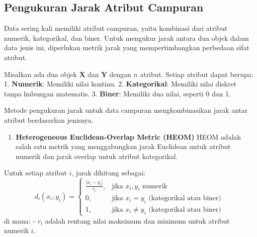 \documentclass[
  oneside]{book}
\newenvironment{Shaded}{\begin{snugshade}}{\end{snugshade}}
\newcommand{\CommentTok}[1]{\textcolor[rgb]{0.56,0.35,0.01}{\textit{#1}}}
\newcommand{\FunctionTok}[1]{\textcolor[rgb]{0.13,0.29,0.53}{\textbf{#1}}}
\newcommand{\NormalTok}[1]{#1}
\newcommand{\OtherTok}[1]{\textcolor[rgb]{0.56,0.35,0.01}{#1}}
\providecommand{\tightlist}{%
  \setlength{\itemsep}{0pt}\setlength{\parskip}{0pt}}
\begin{document}
\begin{Shaded}
\end{Shaded}

\subsection{Pengukuran Jarak Atribut Campuran}\label{pengukuran-jarak-atribut-campuran}

Data sering kali memiliki atribut campuran, yaitu kombinasi dari atribut numerik, kategorikal, dan biner. Untuk mengukur jarak antara dua objek dalam data jenis ini, diperlukan metrik jarak yang mempertimbangkan perbedaan sifat atribut.

Misalkan ada dua objek \(\mathbf{X}\) dan \(\mathbf{Y}\) dengan \(n\) atribut. Setiap atribut dapat berupa: 1. \textbf{Numerik}: Memiliki nilai kontinu. 2. \textbf{Kategorikal}: Memiliki nilai diskret tanpa hubungan matematis. 3. \textbf{Biner}: Memiliki dua nilai, seperti 0 dan 1.

Metode pengukuran jarak untuk data campuran mengkombinasikan jarak antar atribut berdasarkan jenisnya.

\begin{enumerate}
\def\labelenumi{\arabic{enumi}.}
\tightlist
\item
  \textbf{Heterogeneous Euclidean-Overlap Metric (HEOM)} HEOM adalah salah satu metrik yang menggabungkan jarak Euclidean untuk atribut numerik dan jarak overlap untuk atribut kategorikal.
\end{enumerate}

Untuk setiap atribut \(i\), jarak dihitung sebagai: \[
d_i(x_i, y_i) =
\begin{cases} 
\frac{|x_i - y_i|}{r_i}, & \text{jika } x_i, y_i \text{ numerik} \\
0, & \text{jika } x_i = y_i \text{ (kategorikal atau biner)} \\
1, & \text{jika } x_i \neq y_i \text{ (kategorikal atau biner)} 
\end{cases}
\] di mana: - \(r_i\) adalah rentang nilai maksimum dan minimum untuk atribut numerik \(i\).
\end{document}
